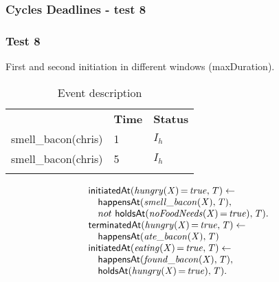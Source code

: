 \documentclass[8pt]{beamer}
\DeclareMathOperator{\val}{=}  %
\def \patsize {}
\def\happensAt{\textsf{\patsize happensAt}}
\def\holdsAt{\textsf{\patsize holdsAt}}
\def\initiatedAt{\textsf{\patsize initiatedAt}}
\def\terminatedAt{\textsf{\patsize terminatedAt}}
\newenvironment{mysplit}%
  {\arraycolsep 0pt \begin{array}{l}}%
  {\end{array}}
\begin{document}
\begin{frame}
    \frametitle{Cycles Deadlines - test 8}
    \subsubsection{Test 8}
    \small
    First and second initiation in different windows (maxDuration).\linebreak
    \begin{minipage}{0.4\linewidth}
        \begin{table}[t!]
            \caption{Event description}
            \begin{center}

                \begin{tabular}{lll}
                    \hline\noalign{\smallskip}
                    \multicolumn{1}{l}{\textbf{Event}} & \multicolumn{1}{c}{\textbf{Time}} & \multicolumn{1}{c}{\textbf{Status}} \\
                    smell\_bacon(chris)& 1 & $I_{h}$\\
                    smell\_bacon(chris)& 5 & $I_{h}$\\
                    \noalign{\smallskip}
                    \hline
                \end{tabular}
            \end{center}
        \end{table}
    \end{minipage}
    \begin{minipage}{0.55\linewidth}
        \begin{align*}
            \begin{mysplit}
                \initiatedAt\mathit{(hungry(X)\val true,T)\leftarrow}\\
                \quad    \happensAt\mathit{(smell\_bacon(X),T),}\\
                \quad    not\ \holdsAt\mathit{(noFoodNeeds(X)\val true),T).}\\
                \terminatedAt\mathit{(hungry(X)\val true,T)\leftarrow}\\
                \quad    \happensAt\mathit{(ate\_bacon(X),T)}\\
                \initiatedAt\mathit{(eating(X)\val true,T)\leftarrow}\\
                \quad    \happensAt\mathit{(found\_bacon(X),T),}\\
                \quad    \holdsAt\mathit{(hungry(X)\val true),T).}\\

\end{mysplit}
\end{align*}
\end{minipage}
\end{frame}
\end{document}

